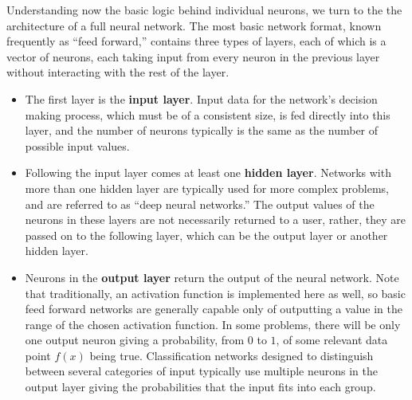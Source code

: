 \documentclass{article}
\begin{document}
Understanding now the basic logic behind individual neurons, we turn to the the architecture of a full neural network. The most basic network format, known frequently as ``feed forward,'' contains three types of layers, each of which is a vector of neurons, each taking input from every neuron in the previous layer without interacting with the rest of the layer.
\begin{itemize}
\item{The first layer is the \textbf{input layer}. Input data for the network's decision making process, which must be of a consistent size, is fed directly into this layer, and the number of neurons typically is the same as the number of possible input values.}
\item{Following the input layer comes at least one \textbf{hidden layer}. Networks with more than one hidden layer are typically used for more complex problems, and are referred to as ``deep neural networks.'' The output values of the neurons in these layers are not necessarily returned to a user, rather, they are passed on to the following layer, which can be the output layer or another hidden layer.}
\item{Neurons in the \textbf{output layer} return the output of the neural network. Note that traditionally, an activation function is implemented here as well, so basic feed forward networks are generally capable only of outputting a value in the range of the chosen activation function. In some problems, there will be only one output neuron giving a probability, from $0$ to $1$, of some relevant data point $f(x)$ being true. Classification networks designed to distinguish between several categories of input typically use multiple neurons in the output layer giving the probabilities that the input fits into each group.}
\end{itemize}
\end{document}
